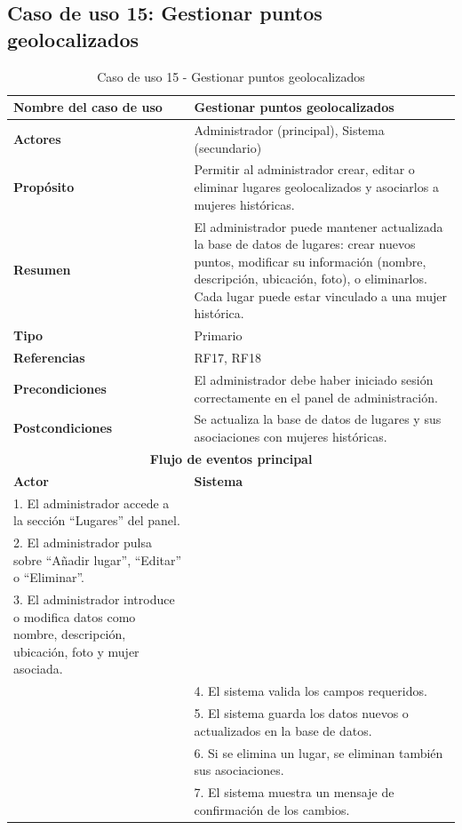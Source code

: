 \clearpage
\subsection{Caso de uso 15: Gestionar puntos geolocalizados}

\begin{table}[H]
\centering
\caption{Caso de uso 15 - Gestionar puntos geolocalizados}
\begin{tabular}{|p{4.5cm}|p{10.5cm}|}
\hline
\textbf{Nombre del caso de uso} & Gestionar puntos geolocalizados \\
\hline
\textbf{Actores} & Administrador (principal), Sistema (secundario) \\
\hline
\textbf{Propósito} & Permitir al administrador crear, editar o eliminar lugares geolocalizados y asociarlos a mujeres históricas. \\
\hline
\textbf{Resumen} & El administrador puede mantener actualizada la base de datos de lugares: crear nuevos puntos, modificar su información (nombre, descripción, ubicación, foto), o eliminarlos. Cada lugar puede estar vinculado a una mujer histórica. \\
\hline
\textbf{Tipo} & Primario \\
\hline
\textbf{Referencias} & RF17, RF18 \\
\hline
\textbf{Precondiciones} & El administrador debe haber iniciado sesión correctamente en el panel de administración. \\
\hline
\textbf{Postcondiciones} & Se actualiza la base de datos de lugares y sus asociaciones con mujeres históricas. \\
\hline
\multicolumn{2}{|c|}{\textbf{Flujo de eventos principal}} \\
\hline
\textbf{Actor} & \textbf{Sistema} \\
\hline
1. El administrador accede a la sección “Lugares” del panel. & \\
\hline
2. El administrador pulsa sobre “Añadir lugar”, “Editar” o “Eliminar”. & \\
\hline
3. El administrador introduce o modifica datos como nombre, descripción, ubicación, foto y mujer asociada. & \\
\hline
& 4. El sistema valida los campos requeridos. \\
\hline
& 5. El sistema guarda los datos nuevos o actualizados en la base de datos. \\
\hline
& 6. Si se elimina un lugar, se eliminan también sus asociaciones. \\
\hline
& 7. El sistema muestra un mensaje de confirmación de los cambios. \\
\hline
\end{tabular}
\end{table}


